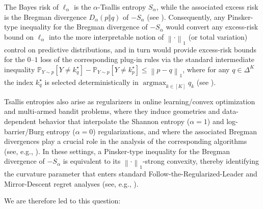 \documentclass[11pt,oneside,a4paper]{article}
\newcommand{\Pb}{\mathbb{P}}
\newcommand{\lsb}[1]{\left[#1\right]}
\newcommand{\lno}[1]{\left\lVert#1\right\rVert}
\DeclareMathOperator*{\argmax}{argmax}
\theoremstyle{plain}
\theoremstyle{definition}
\theoremstyle{remark}
\begin{document}
The Bayes risk of $\ell_\alpha$ is the
$\alpha$-Tsallis entropy $S_\alpha$,
while the associated excess risk is the Bregman divergence $D_\alpha(p\Vert q)$ of $-S_\alpha$ (see ). 
Consequently, any Pinsker-type inequality
for the Bregman divergence of $-S_\alpha$ would convert any excess-risk bound on $\ell_\alpha$
into the more interpretable notion of $\lno{\cdot}_1$ (or total variation) control on predictive distributions, and in turn would provide excess-risk bounds for the $0$--$1$ loss of the corresponding plug-in rules via the standard intermediate inequality
$
    \Pb_{Y\sim p} \lsb{ Y \neq k_q^\star }
    -
    \Pb_{Y\sim p}\lsb{Y \neq k_p^\star}
\le
    \lno{p-q}_1
$,
where for any $q \in \Delta^K$ the index $k_q^\star$ is selected deterministically in $\argmax_{k\in[K]} q_k$ (see ).

Tsallis entropies also arise as regularizers in online learning/convex optimization and multi-armed bandit problems, where they induce geometries and data-dependent behavior that interpolate the Shannon entropy ($\alpha=1$) and log-barrier/Burg entropy ($\alpha=0$) regularizations, and where the associated Bregman divergences play a crucial role in the analysis of the corresponding algorithms (see, e.g., \citealt{abernethy2015fighting,ZimmertSeldin2019TsallisINF,ZimmertSeldin2021BestOfBothWorlds,cesa2022nonstochastic,masoudian21a,kulis2010implicit}).
In these settings, a Pinsker-type inequality for the Bregman divergence of $-S_\alpha$ is equivalent to its $\lno{\cdot}_1$-strong convexity, thereby identifying the curvature parameter that enters standard Follow-the-Regularized-Leader and Mirror-Descent regret analyses (see, e.g., \citealt[Theorem~2.11]{shalev2012online}).

We are therefore led to this question:
\end{document}
